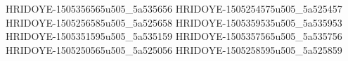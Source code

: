 HRIDOYE-1505356565u505_5a535656
HRIDOYE-1505254575u505_5a525457
HRIDOYE-1505256585u505_5a525658
HRIDOYE-1505359535u505_5a535953
HRIDOYE-1505351595u505_5a535159
HRIDOYE-1505357565u505_5a535756
HRIDOYE-1505250565u505_5a525056
HRIDOYE-1505258595u505_5a525859
